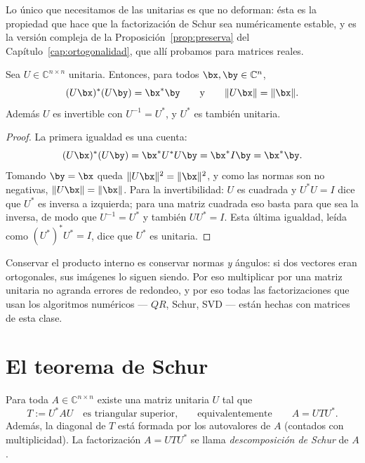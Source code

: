 Lo único que necesitamos de las unitarias es que no deforman: ésta es la propiedad que
hace que la factorización de Schur sea numéricamente estable, y es la versión compleja
de la Proposición~\ref{prop:preserva} del Capítulo~\ref{cap:ortogonalidad}, que allí
probamos para matrices reales.

\begin{proposicion}\label{prop:unitarias-preservan}
Sea $U\in\mathbb{C}^{n\times n}$ unitaria. Entonces, para todos
$\bx,\by\in\mathbb{C}^{n}$,
\[
(U\bx)^{*}(U\by)=\bx^{*}\by
\qquad\text{y}\qquad
\|U\bx\|=\|\bx\| .
\]
Además $U$ es invertible con $U^{-1}=U^{*}$, y $U^{*}$ es también unitaria.
\end{proposicion}

\begin{proof}
La primera igualdad es una cuenta:
\[
(U\bx)^{*}(U\by)=\bx^{*}U^{*}U\by=\bx^{*}I\by=\bx^{*}\by .
\]
Tomando $\by=\bx$ queda $\|U\bx\|^{2}=\|\bx\|^{2}$, y como las normas son no negativas,
$\|U\bx\|=\|\bx\|$. Para la invertibilidad: $U$ es cuadrada y $U^{*}U=I$ dice que
$U^{*}$ es inversa a izquierda; para una matriz cuadrada eso basta para que sea la
inversa, de modo que $U^{-1}=U^{*}$ y también $UU^{*}=I$. Esta última igualdad, leída
como $(U^{*})^{*}U^{*}=I$, dice que $U^{*}$ es unitaria.
\end{proof}

Conservar el producto interno es conservar normas \emph{y} ángulos: si dos vectores eran
ortogonales, sus imágenes lo siguen siendo. Por eso multiplicar por una matriz unitaria
no agranda errores de redondeo, y por eso todas las factorizaciones que usan los
algoritmos numéricos --- $QR$, Schur, SVD --- están hechas con matrices de esta clase.

\section{El teorema de Schur}\label{sec:teo-schur}

\begin{theorem}[Schur]\label{teo:schur}   %
Para toda $A\in\mathbb{C}^{n\times n}$ existe una matriz unitaria $U$ tal que
\[
T:=U^{*}AU \quad\text{es triangular superior,}\qquad\text{equivalentemente}\qquad A=UTU^{*}.
\]
Además, la diagonal de $T$ está formada por los autovalores de $A$ (contados con
multiplicidad). La factorización $A=UTU^{*}$ se llama \emph{descomposición de Schur} de $A$.
\end{theorem}

